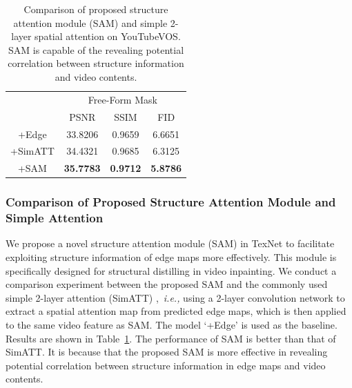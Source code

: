 

\begin{table}[t]
	\caption{Comparison of proposed structure attention module (SAM) and simple 2-layer spatial attention on YouTubeVOS. SAM is capable of the revealing potential correlation between structure information and video contents. }\smallskip
	\scriptsize
	\centering
	{
		\smallskip\begin{tabular}{c|c|c|c}
			\hline
			&\multicolumn{3}{c}{Free-Form Mask} \\
			\cline{2-4} 
			& PSNR & SSIM & FID\\
			
			\hline
			+Edge  &33.8206    &0.9659  &    6.6651 \\
			\hline
			
			+SimATT &34.4321    &0.9685  &   6.3125 \\
			
			\hline
			
			+SAM &\textbf{35.7783}    &\textbf{0.9712}  &   \textbf{5.8786}\\
			\hline
			
			
			
			
		\end{tabular}
	}
	\label{tab:sam_com}
\end{table}



\subsubsection{Comparison of Proposed Structure Attention Module and Simple Attention}

We propose a novel structure attention module (SAM) in TexNet to facilitate exploiting structure information of edge maps more effectively. This module is specifically designed for structural distilling in video inpainting. 
We conduct a comparison experiment between the proposed SAM and the commonly used simple 2-layer attention (SimATT) \cite{min2019two},~\emph{i.e.,} using a 2-layer convolution network to extract a spatial attention map from predicted edge maps, which is then applied to the same video feature as SAM. 
The model `+Edge' is used as the baseline.
Results are shown in Table~\ref{tab:sam_com}.
The performance of SAM is better than that of SimATT. It is because that the proposed SAM is more effective in revealing potential correlation between structure information in edge maps and video contents. %




